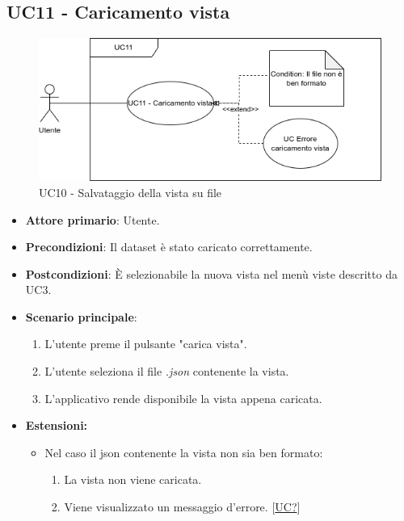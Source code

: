 \subsection{UC11 - Caricamento vista}
\label{sec:UC11}
\begin{figure}[h!]
    \centering
    \includegraphics[scale=0.55]{../../assets/caricamento_vista.png}
    \caption{UC10 - Salvataggio della vista su file}
\end{figure}
\begin{itemize}
    \item \textbf{Attore primario}: Utente.
    \item \textbf{Precondizioni}: Il dataset è stato caricato correttamente.
    \item \textbf{Postcondizioni}: È selezionabile la nuova vista nel menù viste descritto da UC3.
    \item \textbf{Scenario principale}:
          \begin{enumerate}
              \item L'utente preme il pulsante "carica vista".
              \item L'utente seleziona il file \textit{.json} contenente la vista.
              \item L'applicativo rende disponibile la vista appena caricata.
          \end{enumerate}
    \item \textbf{Estensioni:}
    \begin{itemize}
        \item Nel caso il json contenente la vista non sia ben formato: \begin{enumerate}
            \item La vista non viene caricata.
            \item Viene visualizzato un messaggio d'errore. [\hyperref[sec:UC - Errore caricamento vista]{UC?}]
        \end{enumerate}
    \end{itemize}
\end{itemize}

